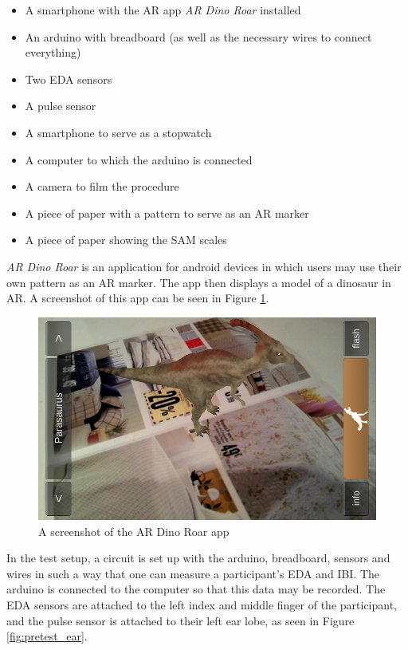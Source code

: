 \begin{itemize}
    \item A smartphone with the AR app \textit{AR Dino Roar} installed
    \item An arduino with breadboard (as well as the necessary wires to connect everything)
    \item Two EDA sensors
    \item A pulse sensor
    \item A smartphone to serve as a stopwatch
    \item A computer to which the arduino is connected
    \item A camera to film the procedure
    \item A piece of paper with a pattern to serve as an AR marker
    \item A piece of paper showing the SAM scales
\end{itemize}

\textit{AR Dino Roar} is an application for android devices in which users may use their own pattern as an AR marker. The app then displays a model of a dinosaur in AR. A screenshot of this app can be seen in Figure \ref{fig:dino}.

\begin{figure}[h!]
	\centering
    \includegraphics[scale=0.5]{figures/AR_dino.png}
    \caption{A screenshot of the AR Dino Roar app \cite{ARDino}}\label{fig:dino}
\end{figure}

In the test setup, a circuit is set up with the arduino, breadboard, sensors and wires in such a way that one can measure a participant’s EDA and IBI. The arduino is connected to the computer so that this data may be recorded. The EDA sensors are attached to the left index and middle finger of the participant, and the pulse sensor is attached to their left ear lobe, as seen in Figure \ref{fig:pretest_ear}.

